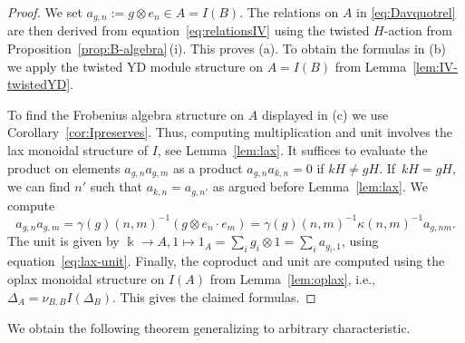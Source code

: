 \documentclass[pdftex]{sigma}
\numberwithin{equation}{section}
\newcommand{\rI}{I}
\begin{document}
\begin{proof}We set $a_{g,n}:=g\otimes e_n\in A=\rI(B)$.
The relations on $A$ in \eqref{eq:Davquotrel} are then derived from equation~\eqref{eq:relationsIV} using the twisted $H$-action from Proposition~\ref{prop:B-algebra}\,(i). This proves (a). To obtain the formulas in (b) we apply the twisted YD module structure on $A=\rI(B)$ from Lemma~\ref{lem:IV-twistedYD}.

To find the Frobenius algebra structure on $A$ displayed in (c) we use Corollary~\ref{cor:Ipreserves}. Thus, computing multiplication and unit involves the lax monoidal structure of $\rI$, see Lemma~\ref{lem:lax}. It suffices to evaluate the product on elements $a_{g,n}a_{g,m}$ as a product $a_{g,n}a_{k,n}=0$ if $kH\neq gH$. If~$kH=gH$, we can find $n'$ such that $a_{k,n}=a_{g,n'}$ as argued before Lemma~\ref{lem:lax}.
We compute
\[a_{g,n}a_{g,m}=\gamma(g)(n,m)^{-1}(g\otimes e_n\cdot e_m)=\gamma(g)(n,m)^{-1}\kappa(n,m)^{-1}a_{g,nm}.\]
The unit is given by $\Bbbk \to A, 1\mapsto 1_A= \sum_{i}g_i\otimes 1=\sum_ia_{g_i,1}$, using equation~\eqref{eq:lax-unit}. Finally, the coproduct and unit are computed using the oplax monoidal structure on $\rI(A)$ from Lemma~\ref{lem:oplax}, i.e., $\Delta_A=\nu_{B,B}\rI(\Delta_B)$. This gives the claimed formulas.
\end{proof}



We obtain the following theorem generalizing \cite[Theorem 3.15]{DS} to arbitrary characteristic.
\end{document}
